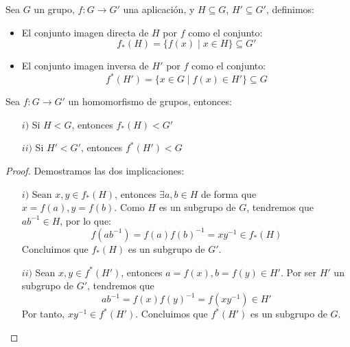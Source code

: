 \begin{definicion}
    Sea $G$ un grupo, $f:G\to G'$ una aplicación, y $H\subseteq G$, $H'\subseteq G'$, definimos:
    \begin{itemize}
        \item El conjunto imagen directa de $H$ por $f$ como el conjunto:
            \begin{equation*}
                f_\ast(H) = \{f(x) \mid x\in H\}\subseteq G'
            \end{equation*}
        \item El conjunto imagen inversa de $H'$ por $f$ como el conjunto:
            \begin{equation*}
                f^\ast(H') = \{x\in G \mid f(x) \in H'\}\subseteq G
            \end{equation*}
    \end{itemize}
\end{definicion}

\begin{prop}
    Sea $f:G\to G'$ un homomorfismo de grupos, entonces: 
    \begin{enumerate}
        \item[$i)$] Si $H<G$, entonces $f_\ast(H)< G'$ 
        \item[$ii)$] Si $H'<G'$, entonces $f^\ast(H')< G$
    \end{enumerate}
    \begin{proof}
        Demostramos las dos implicaciones:
        \begin{enumerate}
            \item[$i)$] Sean $x,y\in f_\ast(H)$, entonces $\exists a,b\in H$ de forma que $x=f(a), y=f(b)$. Como $H$ es un subgrupo de $G$, tendremos que $ab^{-1}\in H$, por lo que:
            $$f(ab^{-1}) = f(a){f(b)}^{-1} = xy^{-1}\in f_\ast(H)$$
            Concluimos que $f_\ast(H)$ es un subgrupo de $G'$.
            \item[$ii)$] Sean $x,y\in f^\ast(H')$, entonces $a=f(x), b=f(y)\in H'$. Por ser $H'$ un subgrupo de $G'$, tendremos que
            $$ab^{-1} = f(x){f(y)}^{-1}=f(xy^{-1})\in H'$$
            Por tanto, ${xy^{-1}\in f^\ast(H')}$. Concluimos que $f^\ast(H')$ es un subgrupo de $G$.
        \end{enumerate}
    \end{proof}
\end{prop}

